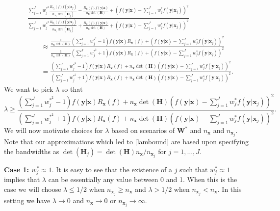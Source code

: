 \documentclass[11pt]{article}
\newcommand{\Hbf}{\textbf{H}}
\newcommand{\W}{\textbf{W}}
\newcommand{\y}{\textbf{y}}
\newcommand{\x}{\textbf{x}}
\newcommand{\Wstar}{\W^{\textstyle{*}}}
\newcommand{\wstar}{w^{\textstyle{*}}}
\newcommand{\wstarsq}{w^{\textstyle{*}^2}}
\begin{document}
\begin{align*}
  &\frac
  {
    \sum_{j=1}^J\wstarsq_j\frac{R_{\x_j}(f)f(\y|\x_j)}{n_{\x_j}\det(\Hbf_j)} 
      - \frac{R_{\x}(f)f(\y|\x)}{n_\x\det(\Hbf)}
      + \left(f(\y|\x) - \sum_{j=1}^J\wstar_jf(\y|\x_j)\right)^2
  }
  {
    \sum_{j=1}^J\wstarsq_j\frac{R_{\x_j}(f)f(\y|\x_j)}{n_{\x_j}\det(\Hbf_j)}
      + \frac{R_{\x}(f)f(\y|\x)}{n_\x\det(\Hbf)} 
      + \left(f(\y|\x) - \sum_{j=1}^J\wstar_jf(\y|\x_j)\right)^2
  } \\
  &\qquad\approx \frac
  {
    \frac{1}{n_\x\det(\Hbf)}
    \left(\sum_{j=1}^J\wstarsq_j - 1\right)f(\y|\x)R_{\x}(f)
      + \left(f(\y|\x) - \sum_{j=1}^J\wstar_jf(\y|\x_j)\right)^2
  }
  {
    \frac{1}{n_\x\det(\Hbf)}
    \left(\sum_{j=1}^J\wstarsq_j + 1\right)f(\y|\x)R_{\x}(f) 
      + \left(f(\y|\x) - \sum_{j=1}^J\wstar_jf(\y|\x_j)\right)^2
  } \\
  &\qquad= \frac
  {
    \left(\sum_{j=1}^J\wstarsq_j - 1\right)f(\y|\x)R_{\x}(f)
      + n_\x\det(\Hbf)\left(f(\y|\x) - \sum_{j=1}^J\wstar_jf(\y|\x_j)\right)^2
  }
  {
    \left(\sum_{j=1}^J\wstarsq_j + 1\right)f(\y|\x)R_{\x}(f) 
      + n_\x\det(\Hbf)\left(f(\y|\x) - \sum_{j=1}^J\wstar_jf(\y|\x_j)\right)^2
  }. %
\end{align*}
We want to pick $\lambda$ so that
\begin{equation} \label{lambound}
  \lambda \geq \frac
  {
    \left(\sum_{j=1}^J\wstarsq_j - 1\right)f(\y|\x)R_{\x}(f)
      + n_\x\det(\Hbf)\left(f(\y|\x) - \sum_{j=1}^J\wstar_jf(\y|\x_j)\right)^2
  }
  {
    \left(\sum_{j=1}^J\wstarsq_j + 1\right)f(\y|\x)R_{\x}(f) 
      + n_\x\det(\Hbf)\left(f(\y|\x) - \sum_{j=1}^J\wstar_jf(\y|\x_j)\right)^2
  }.
\end{equation}
We will now motivate choices for $\lambda$ based on scenarios of $\Wstar$ and $n_{\x}$ and $n_{\x_j}$. Note that our approximations which led to \eqref{lambound} are based upon specifying the bandwidths as $\det(\Hbf_j) = \det(\Hbf)n_\x/n_{\x_j}$ for $j = 1,\ldots,J$.

\vspace{0.25cm}
\textbf{Case 1: $\wstar_j \approx 1$}. It is easy to see that the existence of a $j$ such that $\wstar_j \approx 1$ implies that $\lambda$ can be essentially any value between 0 and 1. When this is the case we will choose $\lambda \leq 1/2$ when $n_{\x_j} \geq n_\x$ and $\lambda > 1/2$ when $n_{\x_j} < n_\x$. In this setting we have $\lambda \to 0$ and $n_{\x} \to 0$ or $n_{\x_j} \to \infty$.
\end{document}
